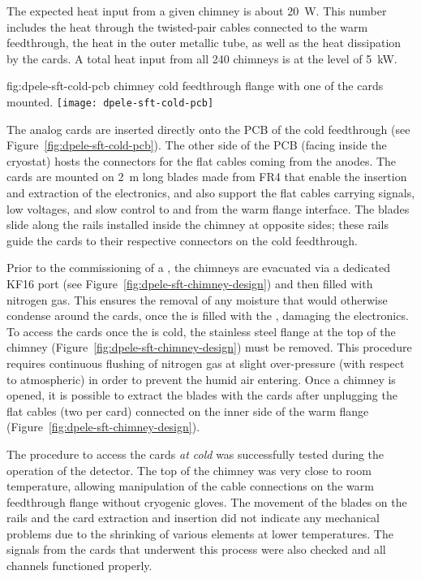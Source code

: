 The expected heat input from a given  chimney is about \SI{20}{\watt}. This number includes the heat through the twisted-pair cables connected to the warm feedthrough, the heat in the   outer metallic tube, as well as the heat dissipation by the  cards. A total heat input from all \num{240}  chimneys is at the level of \SI{5}{\kilo\watt}. 

\begin{dunefigure}{fig:dpele-sft-cold-pcb}
{ chimney cold feedthrough flange with one of the  cards mounted.}
\texttt{[image: dpele-sft-cold-pcb]}
\end{dunefigure}
The analog  cards are inserted directly onto the PCB of the cold feedthrough  (see Figure~\ref{fig:dpele-sft-cold-pcb}). The other side of the PCB (facing inside the cryostat) hosts the connectors for the flat cables coming from the  anodes.  The  cards are mounted on \SI{2}{\m} long blades made from FR4 that enable the insertion and extraction of the electronics, and also support the flat cables carrying signals, low voltages, and slow control to and from the warm flange interface.  The blades slide along the rails installed inside the chimney at opposite sides; %
these rails guide the  cards to their respective connectors on the cold feedthrough. 

Prior to the commissioning of a , the chimneys are evacuated via a dedicated KF16 port (see Figure~\ref{fig:dpele-sft-chimney-design}) and then filled with nitrogen gas. This ensures the removal of %
any moisture that would otherwise condense around the  cards, once the  is filled with the \lar, damaging the electronics. To access the  cards once the  is cold, the stainless steel flange at the top of the  chimney (Figure~\ref{fig:dpele-sft-chimney-design}) must be removed. This procedure requires continuous flushing of nitrogen gas at slight over-pressure (with respect to atmospheric) in order to prevent the humid air entering. %
Once a chimney is opened, it is possible to extract the blades with the  cards after unplugging the flat cables (two per card) connected on the inner side of the warm flange (Figure~\ref{fig:dpele-sft-chimney-design}).

The procedure to access the  cards \textit{at cold} was successfully tested during the operation of the  detector. The %
top of the chimney was very close to room temperature, allowing manipulation of the cable connections on the warm feedthrough flange without %
cryogenic gloves. The movement of the blades on the rails and the  card extraction and insertion did not indicate any mechanical problems %
due to the shrinking of various elements %
at lower temperatures.  The signals from the  cards that underwent %
this process were also checked and %
all channels functioned properly.

